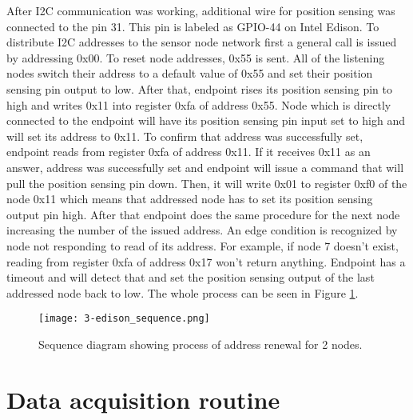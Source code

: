After \ac{I2C} communication was working, additional wire for position sensing was connected to the pin 31. This pin is labeled as GPIO-44 on Intel Edison. To distribute \ac{I2C} addresses to the sensor node network first a general call is issued by addressing 0x00. To reset node addresses, 0x55 is sent. All of the listening nodes switch their address to a default value of 0x55 and set their position sensing pin output to low. After that, endpoint rises its position sensing pin to high and writes 0x11 into register 0xfa of address 0x55. Node which is directly connected to the endpoint will have its position sensing pin input set to high and will set its address to 0x11. To confirm that address was successfully set, endpoint reads from register 0xfa of address 0x11. If it receives 0x11 as an answer, address was successfully set and endpoint will issue a command that will pull the position sensing pin down. Then, it will write 0x01 to register 0xf0 of the node 0x11 which means that addressed node has to set its position sensing output pin high. After that endpoint does the same procedure for the next node increasing the number of the issued address. An edge condition is recognized by node not responding to read of its address. For example, if node 7 doesn't exist, reading from register 0xfa of address 0x17 won't return anything. Endpoint has a timeout and will detect that and set the position sensing output of the last addressed node back to low. The whole process can be seen in Figure \ref{fig:endpoint_sequence}.

\begin{figure}[h]
  \begin{center}
    \texttt{[image: 3-edison\_sequence.png]}
  \end{center}
  \caption{Sequence diagram showing process of address renewal for 2 nodes.}
  \label{fig:endpoint_sequence}
\end{figure}


\section{Data acquisition routine}

